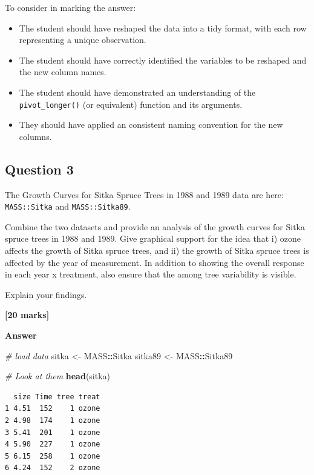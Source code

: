 \documentclass[
  10t,
]{article}
\newenvironment{Shaded}{\begin{snugshade}}{\end{snugshade}}
\newcommand{\CommentTok}[1]{\textcolor[rgb]{0.56,0.35,0.01}{\textit{#1}}}
\newcommand{\FunctionTok}[1]{\textcolor[rgb]{0.13,0.29,0.53}{\textbf{#1}}}
\newcommand{\NormalTok}[1]{#1}
\newcommand{\OtherTok}[1]{\textcolor[rgb]{0.56,0.35,0.01}{#1}}
\newcommand{\SpecialCharTok}[1]{\textcolor[rgb]{0.81,0.36,0.00}{\textbf{#1}}}
\providecommand{\tightlist}{%
  \setlength{\itemsep}{0pt}\setlength{\parskip}{0pt}}
\let\oldtexttt\texttt
\renewcommand{\texttt}[1]{\oldtexttt{\small #1}}
\begin{document}
To consider in marking the answer:

\begin{itemize}
\tightlist
\item
  The student should have reshaped the data into a tidy format, with
  each row representing a unique observation.
\item
  The student should have correctly identified the variables to be
  reshaped and the new column names.
\item
  The student should have demonstrated an understanding of the
  \texttt{pivot\_longer()} (or equivalent) function and its arguments.
\item
  They should have applied an consistent naming convention for the new
  columns.
\end{itemize}

\subsection{Question 3}\label{question-3-1}

The Growth Curves for Sitka Spruce Trees in 1988 and 1989 data are here:
\texttt{MASS::Sitka} and \texttt{MASS::Sitka89}.

Combine the two datasets and provide an analysis of the growth curves
for Sitka spruce trees in 1988 and 1989. Give graphical support for the
idea that i) ozone affects the growth of Sitka spruce trees, and ii) the
growth of Sitka spruce trees is affected by the year of measurement. In
addition to showing the overall response in each year x treatment, also
ensure that the among tree variability is visible.

Explain your findings.

\textbf{{[}20 marks{]}}

\textbf{Answer}

\begin{Shaded}
\begin{Highlighting}[]
\CommentTok{\# load data}
\NormalTok{sitka }\OtherTok{\textless{}{-}}\NormalTok{ MASS}\SpecialCharTok{::}\NormalTok{Sitka}
\NormalTok{sitka89 }\OtherTok{\textless{}{-}}\NormalTok{ MASS}\SpecialCharTok{::}\NormalTok{Sitka89}

\CommentTok{\# Look at them}
\FunctionTok{head}\NormalTok{(sitka)}
\end{Highlighting}
\end{Shaded}

\begin{verbatim}
  size Time tree treat
1 4.51  152    1 ozone
2 4.98  174    1 ozone
3 5.41  201    1 ozone
4 5.90  227    1 ozone
5 6.15  258    1 ozone
6 4.24  152    2 ozone
\end{verbatim}
\end{document}
